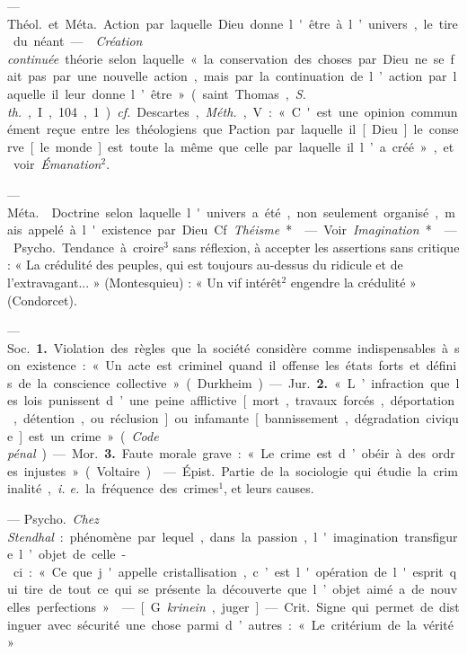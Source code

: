 \begin{itemize}[leftmargin=1cm, label=, itemsep=11pt]
 — \si{Théol.} et \si{Méta.} Action par
laquelle Dieu donne l'être à l’univers, le tire du néant. —  {\it Création
continuée} théorie selon laquelle
« la conservation des choses par
Dieu ne se fait pas par une nouvelle action, mais par la continuation de l’action par laquelle il leur
donne l’être » (saint Thomas, {\it S. th.},
I, 104, 1). {\it cf.} Descartes, {\it Méth.}, V :
« C'est une opinion communément
reçue entre les théologiens que
Paction par laquelle il [Dieu] le
conserve [le monde] est toute la
même que celle par laquelle il l’a
créé », et voir {\it Émanation}$^2$.

 — \si{Méta.}  Doctrine
selon laquelle l'univers a été, non
seulement organisé, mais appelé à
l'existence par Dieu. Cf. {\it Théisme}*.

— Voir {\it Imagination}*.

 — \si{Psycho.} Tendance à
croire$^3$ sans réflexion, à accepter les
assertions sans critique : « La crédulité des peuples, qui est toujours au-dessus du ridicule et de l’extravagant... » (Montesquieu) : « Un vif
intérêt$^2$ engendre la crédulité »
(Condorcet).

 — \si{Soc.} {\bf 1.} Violation des règles
que la société considère comme
indispensables à son existence : « Un
acte est criminel quand il offense les
états forts et définis de la conscience
collective » (Durkheim). — \si{Jur.}
 {\bf 2.} « L’infraction que les lois punissent d’une peine afflictive [mort,
travaux forcés, déportation, détention, ou réclusion] ou infamante
[bannissement, dégradation civique]
est un crime » ({\it Code pénal}).

— \si{Mor.} {\bf 3.} Faute morale grave :
« Le crime est d’obéir à des ordres
injustes » (Voltaire).

 — \si{Épist.} Partie de la
sociologie qui étudie la criminalité,
{\it i. e.} la fréquence des crimes$^1$, et leurs
causes.

 — \si{Psycho.} {\it Chez Stendhal} : phénomène par lequel, dans
la passion, l'imagination transfigure
l’objet de celle-ci : « Ce que j'appelle
cristallisation, c’est l'opération de
l'esprit qui tire de tout ce qui se
présente la découverte que l’objet
aimé a de nouvelles perfections. »

 — [G. {\it krinein}, juger] — \si{Crit.}
Signe qui permet de distinguer avec
sécurité une chose parmi d’autres :
« Le critérium de la vérité. »


\end{itemize}
